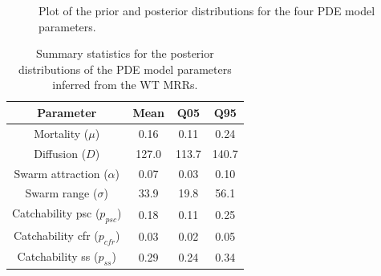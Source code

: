\documentclass[]{bmcart}
\begin{document}
\begin{figure}[t]
\caption[Plot of the prior and posterior distributions for the four PDE model parameters.]{Plot of the prior and posterior distributions for the four PDE model parameters.}\label{fig:prior_posterior}
\end{figure}

\begin{table}[h]
\centering
\begingroup\small
\begin{tabular}{|c|ccc|}
\hline
Parameter & Mean & Q05 & Q95 \\\hline
Mortality ($\mu$) & 0.16 & 0.11 & 0.24\\
Diffusion ($D$) & 127.0 & 113.7 & 140.7\\
Swarm attraction ($\alpha$) & 0.07 & 0.03 & 0.10\\
Swarm range ($\sigma$) & 33.9 & 19.8 & 56.1\\
Catchability psc ($p_{psc}$) & 0.18 & 0.11 & 0.25\\
Catchability cfr ($p_{cfr}$) & 0.03 & 0.02 & 0.05\\
Catchability ss ($p_{ss}$) & 0.29 & 0.24 & 0.34\\
\hline
\end{tabular}
\endgroup
\caption{\label{tble:sumStatPPpost} Summary statistics for the posterior distributions of the PDE model parameters inferred from the WT MRRs. }
\end{table}
\end{document}
